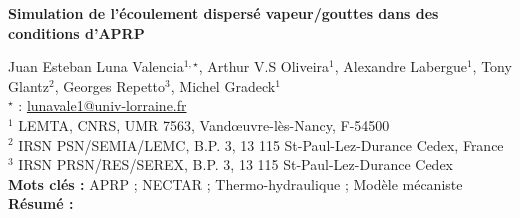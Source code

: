 


    \newpage


%
\begin{flushleft}
\addtocounter{section}{1}
{\Large \textbf{Simulation de l'écoulement dispersé vapeur/gouttes dans des conditions d'APRP}}\label{ref:37}
\end{flushleft}
%
Juan Esteban Luna Valencia$^{1,\star}$, Arthur V.S Oliveira$^{1}$, Alexandre Labergue$^{1}$, Tony Glantz$^{2}$, Georges Repetto$^{3}$, Michel Gradeck$^{1}$\\[2mm]
$^{\star}$ \Letter : \url{lunavale1@univ-lorraine.fr}\\[2mm]
{\footnotesize $^{1}$ LEMTA, CNRS, UMR 7563, Vandœuvre-lès-Nancy, F-54500}\\
{\footnotesize $^{2}$ IRSN PSN/SEMIA/LEMC, B.P. 3, 13 115 St-Paul-Lez-Durance Cedex, France}\\
{\footnotesize $^{3}$ IRSN PRSN/RES/SEREX, B.P. 3, 13 115 St-Paul-Lez-Durance Cedex}\\
[4mm]
%
\noindent \textbf{Mots clés : } APRP ; NECTAR ; Thermo-hydraulique ; Modèle mécaniste\\[4mm]
%
\noindent \textbf{Résumé : } 

